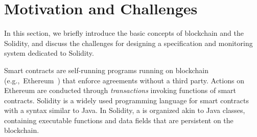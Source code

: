 \section{Motivation and Challenges} 
\label{sec:background}


In this section, 
we briefly introduce the basic concepts of blockchain and the Solidity, and
discuss the challenges 
for designing a specification and monitoring system dedicated to Solidity.

Smart contracts are self-running programs running on blockchain (e.g.,~Ethereum~\cite{buterin2014next}) that enforce agreements without a third party.
Actions on Ethereum are conducted through \textit{transactions} invoking functions of smart contracts.
Solidity is a widely used programming language for smart contracts with a syntax similar to
Java.
In Solidity, a  is organized akin to Java classes, containing 
executable functions and data fields that are persistent on the blockchain.

